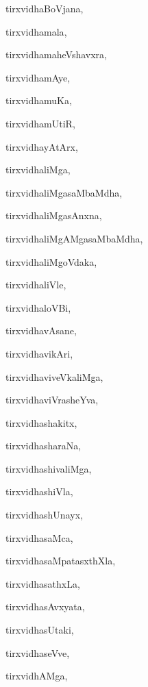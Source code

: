 \begin{multicols}{2}
{tirxvidhaBoVjana}, \pageref{tirxvidhaBoVjana}

{tirxvidhamala}, \pageref{tirxvidhamala}

{tirxvidhamaheVshavxra}, \pageref{tirxvidhamaheVshavxra}

{tirxvidhamAye}, \pageref{tirxvidhamAye}

{tirxvidhamuKa}, \pageref{tirxvidhamuKa}

{tirxvidhamUtiR}, \pageref{tirxvidhamUtiR}

{tirxvidhayAtArx}, \pageref{tirxvidhayAtArx}

{tirxvidhaliMga}, \pageref{tirxvidhaliMga}

{tirxvidhaliMgasaMbaMdha}, \pageref{tirxvidhaliMgasaMbaMdha}

{tirxvidhaliMgasAnxna}, \pageref{tirxvidhaliMgasAnxna}

{tirxvidhaliMgAMgasaMbaMdha}, \pageref{tirxvidhaliMgAMgasaMbaMdha}

{tirxvidhaliMgoVdaka}, \pageref{tirxvidhaliMgoVdaka}

{tirxvidhaliVle}, \pageref{tirxvidhaliVle}

{tirxvidhaloVBi}, \pageref{tirxvidhaloVBi}

{tirxvidhavAsane}, \pageref{tirxvidhavAsane}

{tirxvidhavikAri}, \pageref{tirxvidhavikAri}

{tirxvidhaviveVkaliMga}, \pageref{tirxvidhaviveVkaliMga}

{tirxvidhaviVrasheYva}, \pageref{tirxvidhaviVrasheYva}

{tirxvidhashakitx}, \pageref{tirxvidhashakitx}

{tirxvidhasharaNa}, \pageref{tirxvidhasharaNa}

{tirxvidhashivaliMga}, \pageref{tirxvidhashivaliMga}

{tirxvidhashiVla}, \pageref{tirxvidhashiVla}

{tirxvidhashUnayx}, \pageref{tirxvidhashUnayx}

{tirxvidhasaMca}, \pageref{tirxvidhasaMca}

{tirxvidhasaMpatasxthXla}, \pageref{tirxvidhasaMpatasxthXla}

{tirxvidhasathxLa}, \pageref{tirxvidhasathxLa}

{tirxvidhasAvxyata}, \pageref{tirxvidhasAvxyata}

{tirxvidhasUtaki}, \pageref{tirxvidhasUtaki}

{tirxvidhaseVve}, \pageref{tirxvidhaseVve}

{tirxvidhAMga}, \pageref{tirxvidhAMga}


\end{multicols}

